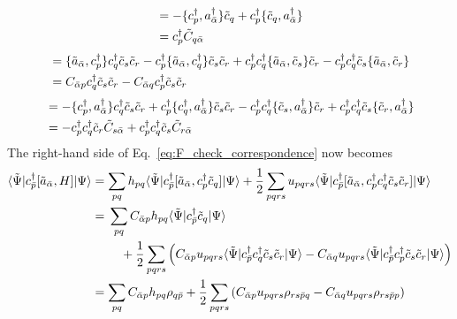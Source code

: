 \documentclass[aip,jcp,preprint,superscriptaddress,nofootinbib]{revtex4-1}
\begin{document}
%
\begin{align}
    [\crea{p} \anni{q}, \creaprim{\bar{\alpha}}] 
    &= - \{ \crea{p}, \creaprim{\bar{\alpha}} \} \anni{q} + \crea{p} \{ \anni{q}, \creaprim{\bar{\alpha}} \} \nn
    &= \crea{p} \tilde{C}_{q \bar{\alpha}} 
\end{align}
%
\begin{align}
    [\anniprim{\bar{\alpha}}, \crea{p} \crea{q} \anni{s} \anni{r}] 
    &= \{ \anniprim{\bar{\alpha}}, \crea{p} \} \crea{q} \anni{s} \anni{r} 
     - \crea{p} \{ \anniprim{\bar{\alpha}}, \crea{q} \} \anni{s} \anni{r}
     + \crea{p} \crea{q} \{ \anniprim{\bar{\alpha}}, \anni{s} \} \anni{r}
     - \crea{p} \crea{q} \anni{s} \{ \anniprim{\bar{\alpha}}, \anni{r} \}  \nn
    &= C_{\bar{\alpha} p} \crea{q} \anni{s} \anni{r} - C_{\bar{\alpha} q} \crea{p} \anni{s} \anni{r}
\end{align}
%
\begin{align}
    [\crea{p} \crea{q} \anni{s} \anni{r}, \creaprim{\bar{\alpha}} ] 
    &= 
    - \{ \crea{p}, \creaprim{\bar{\alpha}} \} \crea{q} \anni{s} \anni{r} 
    + \crea{p} \{ \crea{q}, \creaprim{\bar{\alpha}} \} \anni{s} \anni{r}
    - \crea{p} \crea{q} \{ \anni{s}, \creaprim{\bar{\alpha}} \} \anni{r}
    + \crea{p} \crea{q} \anni{s} \{ \anni{r}, \creaprim{\bar{\alpha}} \}  \nn
    &= -\crea{p} \crea{q} \anni{r} \tilde{C}_{s \bar{\alpha}} + \crea{p} \crea{q} \anni{s} \tilde{C}_{r \bar{\alpha}} 
\end{align}
The right-hand side of Eq.~\eqref{eq:F_check_correspondence} now becomes
\begin{align}
    \elm{\tilde{\Psi}}{ \crea{\bar{p}} [\anniprim{\bar{\alpha}}, H] }{\Psi} 
    &= \sum_{pq} h_{pq} \elm{\tilde{\Psi}}{ \crea{\bar{p}} [\anniprim{\bar{\alpha}}, \crea{p} \anni{q}] }{\Psi}
    + \frac{1}{2} \sum_{pqrs} u_{pqrs} \elm{\tilde{\Psi}}{ \crea{\bar{p}} [\anniprim{\bar{\alpha}}, \crea{p} \crea{q} \anni{s} \anni{r}] }{\Psi} \nn
    &= 
    \begin{multlined}[t]
        \sum_{pq} C_{\bar{\alpha} p} h_{pq} \elm{\tilde{\Psi}}{ \crea{\bar{p}} \anni{q} }{\Psi} \\
        + \frac{1}{2} \sum_{pqrs} \left( 
            C_{\bar{\alpha} p} u_{pqrs} \elm{\tilde{\Psi}}{ \crea{\bar{p}} \crea{q} \anni{s} \anni{r} }{\Psi} -
            C_{\bar{\alpha} q} u_{pqrs} \elm{\tilde{\Psi}}{ \crea{\bar{p}} \crea{p} \anni{s} \anni{r} }{\Psi}
        \right)
    \end{multlined} \nn
    &=  \sum_{pq} C_{\bar{\alpha} p} h_{pq} \rho_{q \bar{p}}
    + \frac{1}{2} \sum_{pqrs} \left( 
        C_{\bar{\alpha} p} u_{pqrs} \rho_{rs \bar{p} q} -
        C_{\bar{\alpha} q} u_{pqrs} \rho_{rs \bar{p} p}
    \right) \label{eq:F_check_correspondence_proof_1}
\end{align}
\end{document}
